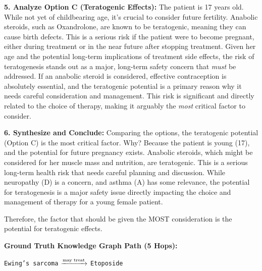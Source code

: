 \documentclass{article}
\theoremstyle{plain}
\theoremstyle{definition}
\theoremstyle{remark}
\begin{document}
\begin{tcolorbox}
{\begin{minipage}{\dimexpr\linewidth-4mm}
        \vspace{0.2cm}
        \textbf{5. Analyze Option C (Teratogenic Effects):} The patient is 17 years old. While not yet of childbearing age, it's crucial to consider future fertility. Anabolic steroids, such as \colorbox{pathhighlight}{Oxandrolone,} are known to be \colorbox{pathhighlight}{teratogenic,} meaning they can cause birth defects. This is a serious risk if the patient were to become \colorbox{pathhighlight}{pregnant,} either during treatment or in the near future after stopping treatment. Given her age and the potential long-term implications of treatment side effects, the risk of teratogenesis stands out as a major, long-term safety concern that \textit{must} be addressed. If an anabolic steroid is considered, effective contraception is absolutely essential, and the teratogenic potential is a primary reason why it needs careful consideration and management. This risk is significant and directly related to the choice of therapy, making it arguably the \textit{most} critical factor to consider.

        \vspace{0.2cm}
        \textbf{6. Synthesize and Conclude:} Comparing the options, the \colorbox{pathhighlight}{teratogenic potential} (Option C) is the most critical factor. Why? Because the patient is young (17), and the potential for future pregnancy exists. Anabolic steroids, which might be considered for her muscle mass and nutrition, are teratogenic. This is a serious long-term health risk that needs careful planning and discussion. While neuropathy (D) is a concern, and asthma (A) has some relevance, the potential for teratogenesis is a major safety issue directly impacting the choice and management of therapy for a young female patient.

        \vspace{0.3cm}
        Therefore, the factor that should be given the MOST consideration is the potential for teratogenic effects.
        \vspace{1mm}
    \end{minipage}%
    }

    \vspace{0.2cm}
    \begin{tcolorbox}[
        colback=truepathback,
        colframe=green!50!black,
        boxrule=0.5pt,
        left=2mm, right=2mm, top=1.5mm, bottom=1.5mm
    ]
        \footnotesize 
        \textbf{Ground Truth Knowledge Graph Path (5 Hops):}
        
        \vspace{0.15cm}
        \centering
        \scriptsize
        \colorbox{pathhighlight}{\texttt{Ewing's sarcoma}} 
        $\xrightarrow{\text{\tiny may treat}}$ 
        \colorbox{pathhighlight}{\texttt{Etoposide}}
        

\end{tcolorbox}
\end{tcolorbox}
\end{document}

